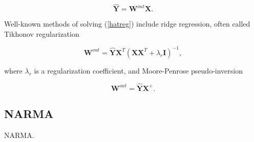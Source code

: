 \begin{equation}
  \mathbf{\hat{Y}} = \mathbf{W}^{out}\mathbf{X}.
  \label{hatreg}
\end{equation}

Well-known methods of solving (\ref{hatreg}) include ridge regression, often
called Tikhonov regularization

\begin{equation}
  \mathbf{W}^{out} = \mathbf{\hat{Y}}\mathbf{X}^{T}
                    (\mathbf{X}\mathbf{X}^{T} + \lambda_{r}\mathbf{I})^{-1},
  \label{tikhonov}
\end{equation}

where $\lambda_{r}$ is a regularization coefficient, and Moore-Penrose
pseudo-inversion

\begin{equation}
  \mathbf{W}^{out} = \mathbf{\hat{Y}}\mathbf{X}^{+}.
  \label{pseudo}
\end{equation}



\subsection{NARMA}

NARMA.






